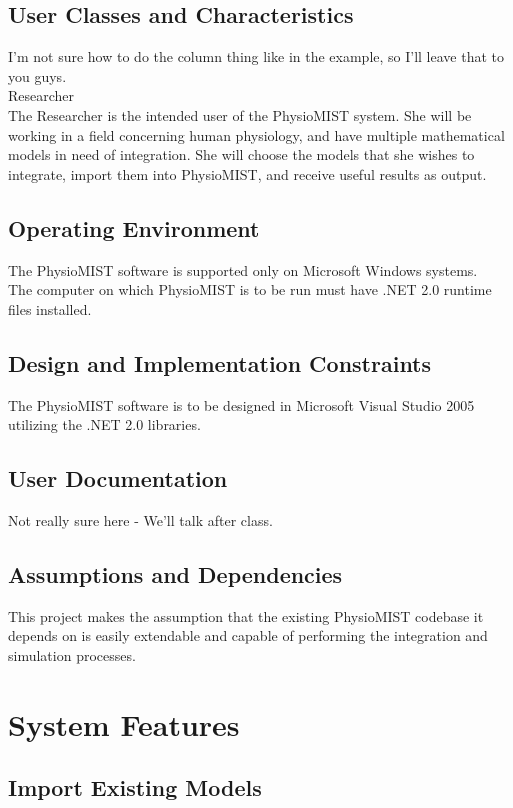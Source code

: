 \documentclass{article}
\begin{document}
\subsection{User Classes and Characteristics}
I'm not sure how to do the column thing like in the example, so I'll leave that to you guys. \\
Researcher \\
The Researcher is the intended user of the PhysioMIST system. She will be working in a field concerning human physiology, and have multiple mathematical models in need of integration. She will choose the models that she wishes to integrate, import them into PhysioMIST, and receive useful results as output.

\subsection{Operating Environment}
The PhysioMIST software is supported only on Microsoft Windows systems. \\
The computer on which PhysioMIST is to be run must have .NET 2.0 runtime files installed. \\

\subsection{Design and Implementation Constraints}
The PhysioMIST software is to be designed in Microsoft Visual Studio 2005 utilizing the .NET 2.0 libraries.

\subsection{User Documentation}
Not really sure here - We'll talk after class.

\subsection{Assumptions and Dependencies}
This project makes the assumption that the existing PhysioMIST codebase it depends on is easily extendable and capable of performing the integration and simulation processes.


\section{System Features}

\subsection{Import Existing Models}
\end{document}
